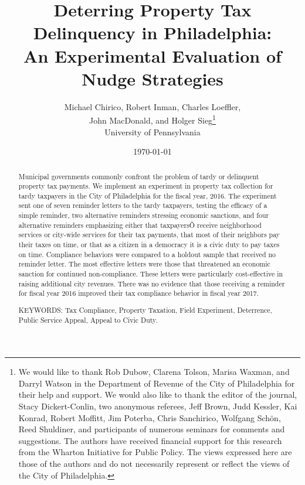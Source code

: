 \documentclass[12pt]{article}
\renewcommand{\thefootnote}{\fnsymbol{footnote}}
\begin{document}
\title{Deterring Property Tax Delinquency in Philadelphia: \\
An Experimental Evaluation of Nudge Strategies}

\author{Michael Chirico, Robert Inman, Charles Loeffler, \\ John
  MacDonald, and Holger Sieg\thanks{We would like to thank Rob Dubow,
    Clarena Tolson, Marisa Waxman, and Darryl Watson in the Department
    of Revenue of the City of Philadelphia for their help and
    support. We would also like to thank the editor of the journal,
    Stacy Dickert-Conlin, two anonymous referees, Jeff Brown, Judd
    Kessler, Kai Konrad, Robert Moffitt, Jim Poterba, Chris
    Sanchirico, Wolfgang Sch\"on, Reed Shuldiner, and participants of
    numerous seminars for comments and suggestions.  The authors have
    received financial support for this research from the Wharton
    Initiative for Public Policy. The views expressed here are those
    of the authors and do not necessarily represent or reflect the
    views of the City of Philadelphia.}  \\ University of
  Pennsylvania}

\date{\today}

\maketitle

\begin{abstract}

Municipal governments commonly confront the problem of tardy or
delinquent property tax payments.  We implement an experiment in
property tax collection for tardy taxpayers in the City of
Philadelphia for the fiscal year, 2016.  The experiment sent one of
seven reminder letters to the tardy taxpayers, testing the efficacy of
a simple reminder, two alternative reminders stressing economic
sanctions, and four alternative reminders emphasizing either that
taxpayersÕ receive neighborhood services or city-wide services for
their tax payments, that most of their neighbors pay their taxes on
time, or that as a citizen in a democracy it is a civic duty to pay
taxes on time.  Compliance behaviors were compared to a holdout sample
that received no reminder letter.  The most effective letters were
those that threatened an economic sanction for continued
non-compliance.  These letters were particularly cost-effective in
raising additional city revenues.  There was no evidence that those
receiving a reminder for fiscal year 2016 improved their tax
compliance behavior in fiscal year 2017.


\bigskip

\noindent KEYWORDS: Tax Compliance, Property Taxation, Field
Experiment, Deterrence, Public Service Appeal, Appeal to Civic Duty.


\end{abstract}
\renewcommand{\thefootnote}{\arabic{footnote}}
\end{document}
